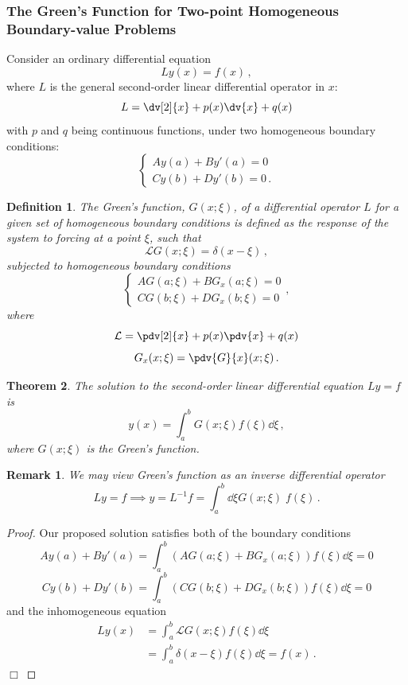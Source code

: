 \documentclass{article}
\theoremstyle{plain}\theoremheaderfont{\normalfont\itshape}\theorembodyfont{\rmfamily}\theoremseparator{.}\newtheorem*{rem}{Remark}\newtheorem*{ex}{Example}\newtheorem*{proof}{Proof}\newtheorem*{altp}{Alternative proof}
\theoremstyle{plain}\theoremheaderfont{\normalfont\bfseries}\theorembodyfont{\rmfamily}\theoremseparator{.}\newtheorem{thm}{Theorem}[section]\newtheorem{lem}[thm]{Lemma}\newtheorem{prop}[thm]{Proposition}\newtheorem*{cor}{Corollary}\newtheorem{defn}[thm]{Definition}\newtheorem{clm}[thm]{Claim}\newtheorem{clminproof}{Claim}
\theoremstyle{break}\theoremheaderfont{\normalfont\itshape}\theorembodyfont{\rmfamily}\theoremseparator{.\medskip}\newtheorem*{proofskip}{Proof}\newtheorem*{exs}{Examples}\newtheorem*{rems}{Remarks}
\theoremstyle{break}\theoremheaderfont{\normalfont\bfseries}\theorembodyfont{\rmfamily}\theoremseparator{.\medskip}\newtheorem{lemskip}[thm]{Lemma}\newtheorem{defnskip}[thm]{Definition}\newtheorem{propskip}[thm]{Proposition}\newtheorem{thmskip}[thm]{Theorem}
\numberwithin{equation}{section}
\newcommand{\qed}{\hfill\ensuremath{\Box}}
\begin{document}
	\subsubsection{The Green's Function for Two-point Homogeneous Boundary-value Problems}
	Consider an ordinary differential equation
	\[Ly(x)=f(x)\,,\]
	where \(L\) is the general second-order linear differential operator in \(x\):
	\[L=\dv[2]{x}+p(x)\dv{x}+q(x)\]
	with \(p\) and \(q\) being continuous functions, under two homogeneous boundary conditions:
	\[\begin{cases}
		Ay(a)+By'(a)=0\\
		Cy(b)+Dy'(b)=0\,.
	\end{cases}\]

	\begin{defn}
		The \textit{Green's function}, \(G(x;\xi)\), of a differential operator \(L\) for a given set of homogeneous boundary conditions is defined as the response of the system to forcing at a point \(\xi\), such that
		\[\mathcal{L}G(x;\xi)=\delta(x-\xi)\,,\]
		subjected to homogeneous boundary conditions
		\[\begin{cases}
			AG(a;\xi)+BG_x(a;\xi)=0\\
			CG(b;\xi)+DG_x(b;\xi)=0
		\end{cases},\]
		where
		\[\mathcal{L}=\pdv[2]{x}+p(x)\pdv{x}+q(x)\]
		\[G_x(x;\xi)=\pdv{G}{x}(x;\xi)\,.\]
	\end{defn}
	
	\begin{thm}
		The solution to the second-order linear differential equation \(Ly=f\) is
		\[y(x)=\int_{a}^{b}G(x;\xi)f(\xi)\dd{\xi}\,,\]
		where \(G(x;\xi)\) is the Green's function.
	\end{thm}
	\begin{rem}
		We may view Green's function as an inverse differential operator
		\[Ly=f \implies y=L^{-1}f=\int_{a}^{b}\dd{\xi}G(x;\xi)\;f(\xi)\,.\]
	\end{rem}	
	\begin{proof}
		Our proposed solution satisfies both of the boundary conditions
		\[Ay(a)+By'(a)=\int_{a}^{b}(AG(a;\xi)+BG_x(a;\xi))f(\xi)\dd{\xi}=0\]
		\[Cy(b)+Dy'(b)=\int_{a}^{b}(CG(b;\xi)+DG_x(b;\xi))f(\xi)\dd{\xi}=0\]
		and the inhomogeneous equation
		\begin{align*}
			Ly(x)&=\int_{a}^{b}\mathcal{L}G(x;\xi)f(\xi)\dd{\xi}\\
			&=\int_{a}^{b}\delta(x-\xi)f(\xi)\dd{\xi}=f(x)\,.
		\end{align*}\qed
	\end{proof}
\end{document}
